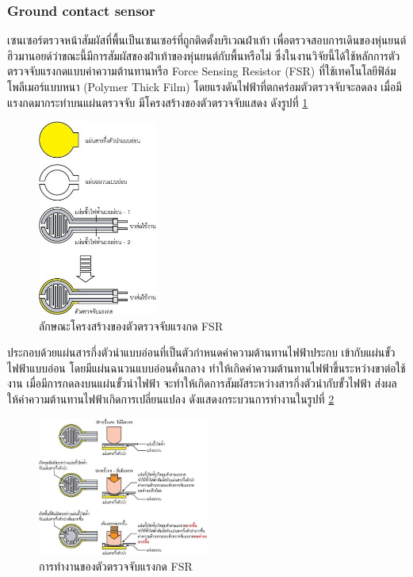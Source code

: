 \clearpage
\subsubsection*{Ground contact sensor}
เซนเซอร์ตรวจหน้าสัมผัสที่พื้นเป็นเซนเซอร์ที่ถูกติดตั้งบริเวณฝ่าเท้า เพื่อตรวจสอบการเดินของหุ่นยนต์ฮิวมานอยด์ว่าขณะนี้มีการสัมผัสของฝ่าเท้าของหุ่นยนต์กับพื้นหรือไม่ 
ซึ่งในงานวิจัยนี้ได้ใช้หลักการตัวตรวจจับแรงกดแบบค่าความต้านทานหรือ Force Sensing Resistor (FSR) ที่ใช้เทคโนโลยีฟิล์มโพลีเมอร์แบบหนา (Polymer Thick Film) 
โดยแรงดันไฟฟ้าที่ตกคร่อมตัวตรวจจับจะลดลง เมื่อมีแรงกดมากระทำบนแผ่นตรวจจับ มีโครงสร้างของตัวตรวจจับแสดง ดังรูปที่ \ref{fig:FSRarchitec}
\begin{figure}[!ht]
    \centering
    \includegraphics[width=0.35\textwidth]{chapter3/images/FSRarchitec.jpg}
    \caption{ลักษณะโครงสร้างของตัวตรวจจับแรงกด FSR}
    \label{fig:FSRarchitec}
\end{figure}

ประกอบด้วยแผ่นสารกึ่งตัวนำแบบอ่อนที่เป็นตัวกำหนดค่าความต้านทานไฟฟ้าประกบ เข้ากับแผ่นขั้วไฟฟ้าแบบอ่อน โดยมีแผ่นฉนวนแบบอ่อนคั่นกลาง 
ทำให้เกิดค่าความต้านทานไฟฟ้าขึ้นระหว่างขาต่อใช้งาน เมื่อมีการกดลงบนแผ่นขั้วนำไฟฟ้า จะทำให้เกิดการสัมผัสระหว่างสารกึ่งตัวนำกับขั้วไฟฟ้า
ส่งผลให้ค่าความต้านทานไฟฟ้าเกิดการเปลี่ยนแปลง ดังแสดงกระบวนการทำงานในรูปที่ \ref{fig:FSRfunction}
\begin{figure}[!ht]
    \centering
    \includegraphics[width=0.5\textwidth]{chapter3/images/FSRfunction.jpg}
    \caption{การทำงานของตัวตรวจจับแรงกด FSR}
    \label{fig:FSRfunction}
\end{figure}

